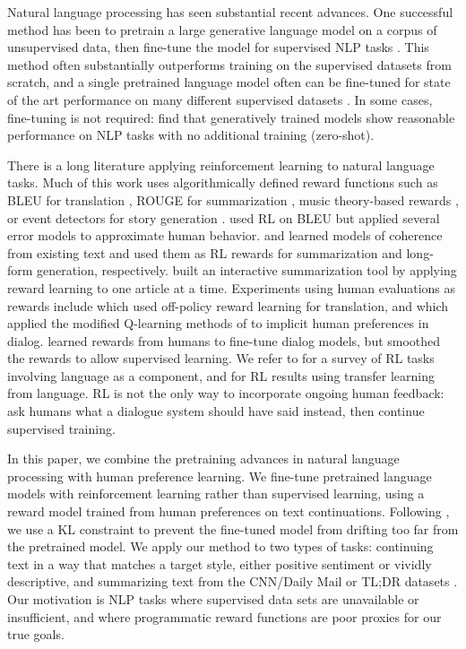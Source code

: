 Natural language processing has seen substantial recent advances.  One successful method has been to pretrain a large generative language model on a corpus of unsupervised data, then fine-tune the model for supervised NLP tasks \citep{dai2015semi, peters2018deep, radford2018improving, khandelwal2019sample}.  This method often substantially outperforms training on the supervised datasets from scratch, and a single pretrained language model often can be fine-tuned for state of the art performance on many different supervised datasets \citep{howard2018universal}.  In some cases, fine-tuning is not required: \citet{radford2019language} find that generatively trained models show reasonable performance on NLP tasks with no additional training (zero-shot).

There is a long literature applying reinforcement learning to natural language tasks.  Much of this work uses algorithmically defined reward functions such as BLEU for translation \citep{ranzato2015sequence,wu2016google}, ROUGE for summarization \citep{ranzato2015sequence,paulus2017deep,wu2018learning,gao2019reward}, music theory-based rewards \citep{jaques2017sequence}, or event detectors for story generation \citep{tambwekar2018controllable}.  \citet{nguyen2017reinforcement} used RL on BLEU but applied several error models to approximate human behavior.  \citet{wu2018learning} and \citet{cho2019towards} learned models of coherence from existing text and used them as RL rewards for summarization and long-form generation, respectively.  \citet{gao2019preference} built an interactive summarization tool by applying reward learning to one article at a time. Experiments using human evaluations as rewards include \citet{kreutzer2018reliability} which used off-policy reward learning for translation, and \citet{jaques2019way} which applied the modified Q-learning methods of \citet{jaques2017sequence} to implicit human preferences in dialog.  \citet{yi2019towards} learned rewards from humans to fine-tune dialog models, but smoothed the rewards to allow supervised learning.  We refer to \citet{luketina2019survey} for a survey of RL tasks involving language as a component, and for RL results using transfer learning from language.  RL is not the only way to incorporate ongoing human feedback: \citet{hancock2019learning} ask humans what a dialogue system should have said instead, then continue supervised training.

In this paper, we combine the pretraining advances in natural language processing with human preference learning.  We fine-tune pretrained language models with reinforcement learning rather than supervised learning, using a reward model trained from human preferences on text continuations.  Following \citet{jaques2017sequence,jaques2019way}, we use a KL constraint to prevent the fine-tuned model from drifting too far from the pretrained model.  We apply our method to two types of tasks: continuing text in a way that matches a target style, either positive sentiment or vividly descriptive, and summarizing text from the CNN/Daily Mail or TL;DR datasets \citep{hermann2015teaching,volske2017tldr}.  Our motivation is NLP tasks where supervised data sets are unavailable or insufficient, and where programmatic reward functions are poor proxies for our true goals.  

